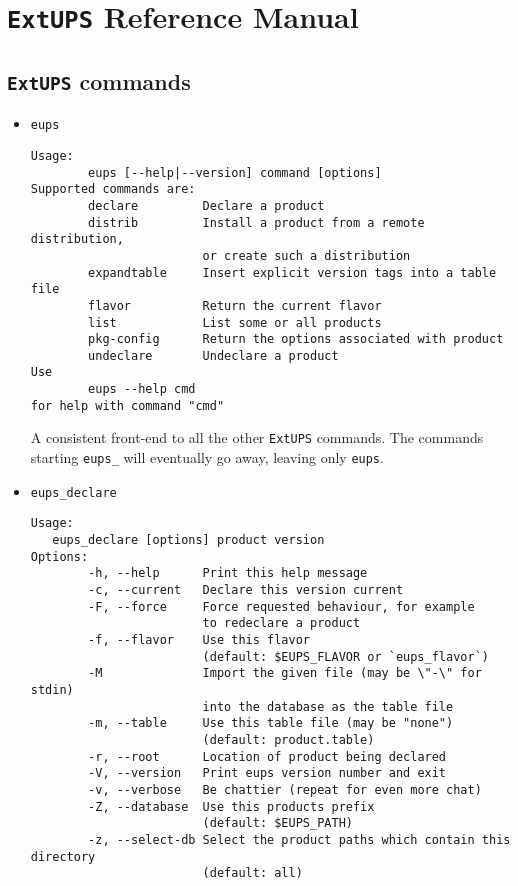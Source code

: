 \documentclass{article}
\newcommand{\code}[1]{\texttt{#1}}
\newcommand{\eups}{\code{ExtUPS}}
\begin{document}
\appendix

\section{\eups{} Reference Manual}

\subsection{\eups{} commands}

\begin{itemize}


  \item \code{eups}
\begin{verbatim}
Usage:
        eups [--help|--version] command [options]
Supported commands are:
        declare         Declare a product
        distrib         Install a product from a remote distribution,
                        or create such a distribution 
        expandtable     Insert explicit version tags into a table file
        flavor          Return the current flavor
        list            List some or all products
        pkg-config      Return the options associated with product
        undeclare       Undeclare a product
Use
        eups --help cmd
for help with command "cmd"
\end{verbatim}
  
A consistent front-end to all the other \eups{} commands.  The commands
starting \code{eups\_} will eventually go away, leaving only \code{eups}.


\item \code{eups\_declare}
\begin{verbatim}
Usage:
   eups_declare [options] product version
Options:
        -h, --help      Print this help message
        -c, --current   Declare this version current
        -F, --force     Force requested behaviour, for example
                        to redeclare a product
        -f, --flavor    Use this flavor
                        (default: $EUPS_FLAVOR or `eups_flavor`)
        -M              Import the given file (may be \"-\" for stdin)
                        into the database as the table file
        -m, --table     Use this table file (may be "none")
                        (default: product.table)
        -r, --root      Location of product being declared
        -V, --version   Print eups version number and exit
        -v, --verbose   Be chattier (repeat for even more chat)
        -Z, --database  Use this products prefix
                        (default: $EUPS_PATH)
        -z, --select-db Select the product paths which contain this directory 
                        (default: all)
\end{verbatim}


\end{itemize}
\end{document}
